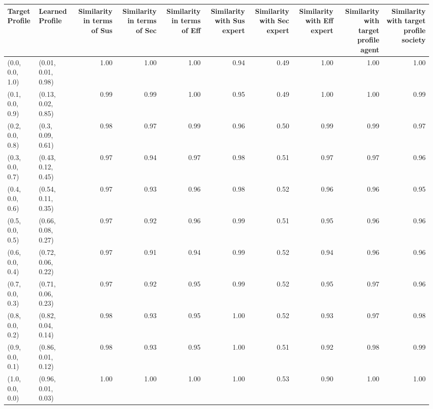 \begin{tabular}{llrrrrrrrr}
\toprule
Target Profile & Learned Profile & Similarity in terms of Sus & Similarity in terms of Sec & Similarity in terms of Eff & Similarity with Sus expert & Similarity with Sec expert & Similarity with Eff expert & Similarity with target profile agent & Similarity with target profile society \\
\midrule
(0.0, 0.0, 1.0) & (0.01, 0.01, 0.98) & 1.00 & 1.00 & 1.00 & 0.94 & 0.49 & 1.00 & 1.00 & 1.00 \\
(0.1, 0.0, 0.9) & (0.13, 0.02, 0.85) & 0.99 & 0.99 & 1.00 & 0.95 & 0.49 & 1.00 & 1.00 & 0.99 \\
(0.2, 0.0, 0.8) & (0.3, 0.09, 0.61) & 0.98 & 0.97 & 0.99 & 0.96 & 0.50 & 0.99 & 0.99 & 0.97 \\
(0.3, 0.0, 0.7) & (0.43, 0.12, 0.45) & 0.97 & 0.94 & 0.97 & 0.98 & 0.51 & 0.97 & 0.97 & 0.96 \\
(0.4, 0.0, 0.6) & (0.54, 0.11, 0.35) & 0.97 & 0.93 & 0.96 & 0.98 & 0.52 & 0.96 & 0.96 & 0.95 \\
(0.5, 0.0, 0.5) & (0.66, 0.08, 0.27) & 0.97 & 0.92 & 0.96 & 0.99 & 0.51 & 0.95 & 0.96 & 0.96 \\
(0.6, 0.0, 0.4) & (0.72, 0.06, 0.22) & 0.97 & 0.91 & 0.94 & 0.99 & 0.52 & 0.94 & 0.96 & 0.96 \\
(0.7, 0.0, 0.3) & (0.71, 0.06, 0.23) & 0.97 & 0.92 & 0.95 & 0.99 & 0.52 & 0.95 & 0.97 & 0.96 \\
(0.8, 0.0, 0.2) & (0.82, 0.04, 0.14) & 0.98 & 0.93 & 0.95 & 1.00 & 0.52 & 0.93 & 0.97 & 0.98 \\
(0.9, 0.0, 0.1) & (0.86, 0.01, 0.12) & 0.98 & 0.93 & 0.95 & 1.00 & 0.51 & 0.92 & 0.98 & 0.99 \\
(1.0, 0.0, 0.0) & (0.96, 0.01, 0.03) & 1.00 & 1.00 & 1.00 & 1.00 & 0.53 & 0.90 & 1.00 & 1.00 \\
\bottomrule
\end{tabular}

